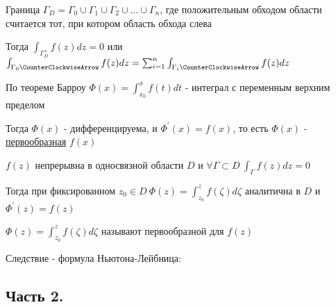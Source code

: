 \begin{enumerate}
\begin{MyTheorem}
    
        Граница $\Gamma_D = \Gamma_0 \cup \Gamma_1 \cup \Gamma_2 \cup \dots \cup \Gamma_n$, где положительным обходом области
        считается тот, при котором область обхода слева
    
        Тогда $\int_{\Gamma_D^+} f(z) dz = 0$ или $\int_{\Gamma_0 \CounterClockwiseArrow} f(z) dz = \sum_{i = 1}^n \int_{\Gamma_i \CounterClockwiseArrow} f(z) dz$ 
    \end{MyTheorem}

    По теореме Барроу $\Phi(x) = \int_{x_0}^x f(t) dt$ - интеграл с переменным верхним пределом

    Тогда $\Phi(x)$ - дифференцируема, и $\Phi^\prime(x) = f(x)$, то есть $\Phi(x)$ - \hyperlink{antiderivative}{первообразная} $f(x)$

    \begin{MyTheorem}
        \Ths $f(z)$ непрерывна в односвязной области $D$ и $\forall \Gamma \subset D \ \int_\Gamma f(z) dz = 0$

        Тогда при фиксированном $z_0 \in D \ \Phi(z) = \int_{z_0}^z f(\zeta) d\zeta$ аналитична в $D$ и $\Phi^\prime(z) = f(z)$
    \end{MyTheorem}

    $\Phi(z) = \int_{z_0}^z f(\zeta) d\zeta$ называют первообразной для $f(z)$

    Следствие - формула Ньютона-Лейбница: 

\end{enumerate}

    

\subsection{Часть 2.}

